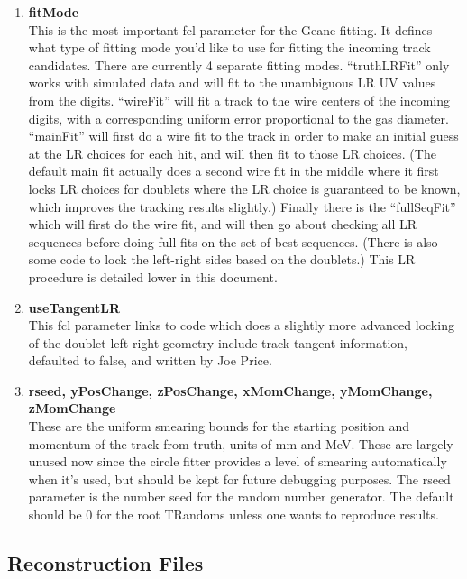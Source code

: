 \documentclass{article}
\begin{document}
\begin{enumerate}
      \item{\bf{fitMode}} \\
      This is the most important fcl parameter for the Geane fitting. It defines what type of fitting mode you'd like to use for fitting the incoming track candidates. There are currently 4 separate fitting modes. ``truthLRFit'' only works with simulated data and will fit to the unambiguous LR UV values from the digits. ``wireFit'' will fit a track to the wire centers of the incoming digits, with a corresponding uniform error proportional to the gas diameter. ``mainFit'' will first do a wire fit to the track in order to make an initial guess at the LR choices for each hit, and will then fit to those LR choices. (The default main fit actually does a second wire fit in the middle where it first locks LR choices for doublets where the LR choice is guaranteed to be known, which improves the tracking results slightly.) Finally there is the ``fullSeqFit'' which will first do the wire fit, and will then go about checking all LR sequences before doing full fits on the set of best sequences. (There is also some code to lock the left-right sides based on the doublets.) This LR procedure is detailed lower in this document.

      \item{\bf{useTangentLR}} \\
      This fcl parameter links to code which does a slightly more advanced locking of the doublet left-right geometry include track tangent information, defaulted to false, and written by Joe Price.

      \item{\bf{rseed, yPosChange, zPosChange, xMomChange, yMomChange, zMomChange}} \\
      These are the uniform smearing bounds for the starting position and momentum of the track from truth, units of mm and MeV. These are largely unused now since the circle fitter provides a level of smearing automatically when it's used, but should be kept for future debugging purposes. The rseed parameter is the number seed for the random number generator. The default should be 0 for the root TRandoms unless one wants to reproduce results.

    \end{enumerate}


  \subsection{Reconstruction Files}
\end{document}
